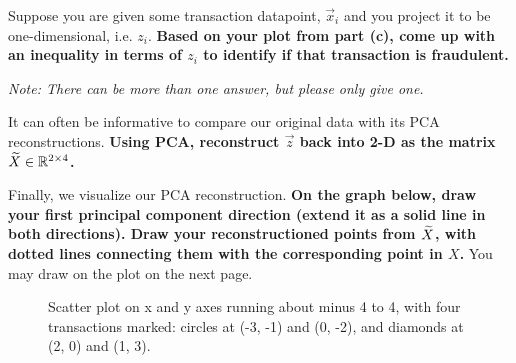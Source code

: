 \begin{enumerate}
		
		\qitem	Suppose you are given some transaction datapoint, $\vec{x}_i$ and you project it to be one-dimensional, i.e. $z_i$. \textbf{Based on your plot from part (c), come up with an inequality in terms of $z_i$ to identify if that transaction is fraudulent.}
			
			\textit{Note: There can be more than one answer, but please only give one.}


		
		\qitem	It can often be informative to compare our original data with its PCA reconstructions. \textbf{Using PCA, reconstruct $\vec{z}$ back into 2-D as the matrix $\widetilde{X} \in \mathbb{R}^{2 \times 4}$.}


		
		\qitem	Finally, we visualize our PCA reconstruction. \textbf{On the graph below, draw your first principal component direction (extend it as a solid line in both directions). Draw your reconstructioned points from $\widetilde{X}$, with dotted lines connecting them with the corresponding point in $X$. } You may draw on the plot on the next page.

			\begin{figure}[H]
				\centering
				\begin{Described}{Scatter plot on x and y axes running about minus 4 to 4, with four transactions marked: circles at (-3, -1) and (0, -2), and diamonds at (2, 0) and (1, 3).}
\end{Described}
\end{figure}
\end{enumerate}
